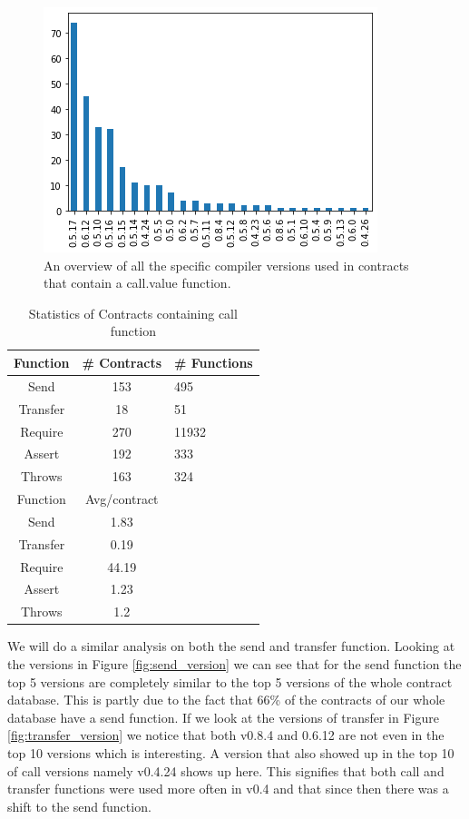 \documentclass[sigconf]{acmart}
\begin{document}
\begin{figure}[h]
  \centering
  \includegraphics[width=\linewidth]{img/versions_call_v3_total.png}
  \caption{An overview of all the specific compiler versions used in contracts that contain a call.value function. }
  \label{fig:call_version}
\end{figure}

\begin{table}
  \caption{Statistics of Contracts containing call function}
  \label{tab:call}
  \begin{tabular}{ccl}
    \toprule
    Function & \# Contracts & \# Functions\\
    \midrule
    Send&153&495\\
    Transfer&18&51\\
    Require&270&11932\\
    Assert&192&333\\
    Throws&163&324\\
    \toprule
    Function & Avg/contract\\
    \midrule
    Send&1.83\\
    Transfer&0.19\\
    Require&44.19\\
    Assert&1.23\\
    Throws&1.2\\
  \bottomrule
\end{tabular}
\end{table}

We will do a similar analysis on both the send and transfer function. Looking at the versions in Figure \ref{fig:send_version} we can see that for the send function the top 5 versions are completely similar to the top 5 versions of the whole contract database. This is partly due to the fact that 66\% of the contracts of our whole database have a send function. If we look at the versions of transfer in Figure \ref{fig:transfer_version} we notice that both v0.8.4 and 0.6.12 are not even in the top 10 versions which is interesting. A version that also showed up in the top 10 of call versions namely v0.4.24 shows up here. This signifies that both call and transfer functions were used more often in v0.4 and that since then there was a shift to the send function. 
\end{document}
